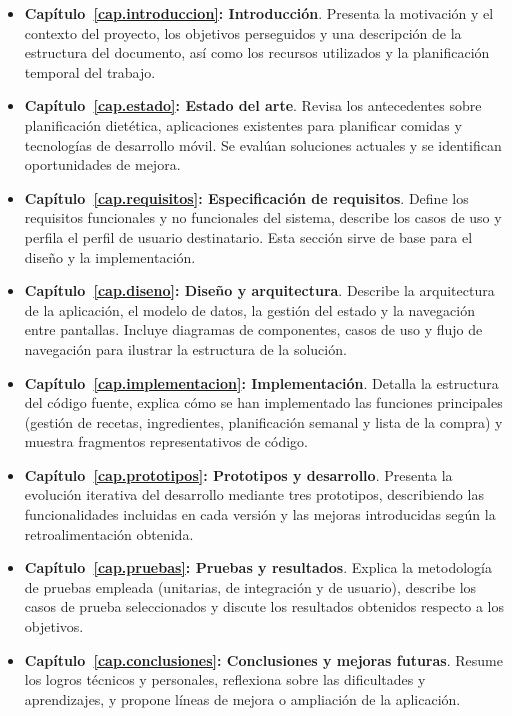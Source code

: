 \documentclass[twoside, openright, 11pt]{report}
\begin{document}
\begin{itemize}
  \item \textbf{Capítulo \ref{cap.introduccion}: Introducción}. Presenta la motivación y el contexto del proyecto, los objetivos perseguidos y una descripción de la estructura del documento, así como los recursos utilizados y la planificación temporal del trabajo.
  \item \textbf{Capítulo \ref{cap.estado}: Estado del arte}. Revisa los antecedentes sobre planificación dietética, aplicaciones existentes para planificar comidas y tecnologías de desarrollo móvil. Se evalúan soluciones actuales y se identifican oportunidades de mejora.
  \item \textbf{Capítulo \ref{cap.requisitos}: Especificación de requisitos}. Define los requisitos funcionales y no funcionales del sistema, describe los casos de uso y perfila el perfil de usuario destinatario. Esta sección sirve de base para el diseño y la implementación.
  \item \textbf{Capítulo \ref{cap.diseno}: Diseño y arquitectura}. Describe la arquitectura de la aplicación, el modelo de datos, la gestión del estado y la navegación entre pantallas. Incluye diagramas de componentes, casos de uso y flujo de navegación para ilustrar la estructura de la solución.
  \item \textbf{Capítulo \ref{cap.implementacion}: Implementación}. Detalla la estructura del código fuente, explica cómo se han implementado las funciones principales (gestión de recetas, ingredientes, planificación semanal y lista de la compra) y muestra fragmentos representativos de código.
  \item \textbf{Capítulo \ref{cap.prototipos}: Prototipos y desarrollo}. Presenta la evolución iterativa del desarrollo mediante tres prototipos, describiendo las funcionalidades incluidas en cada versión y las mejoras introducidas según la retroalimentación obtenida.
  \item \textbf{Capítulo \ref{cap.pruebas}: Pruebas y resultados}. Explica la metodología de pruebas empleada (unitarias, de integración y de usuario), describe los casos de prueba seleccionados y discute los resultados obtenidos respecto a los objetivos.
  \item \textbf{Capítulo \ref{cap.conclusiones}: Conclusiones y mejoras futuras}. Resume los logros técnicos y personales, reflexiona sobre las dificultades y aprendizajes, y propone líneas de mejora o ampliación de la aplicación.
\end{itemize}
\end{document}

